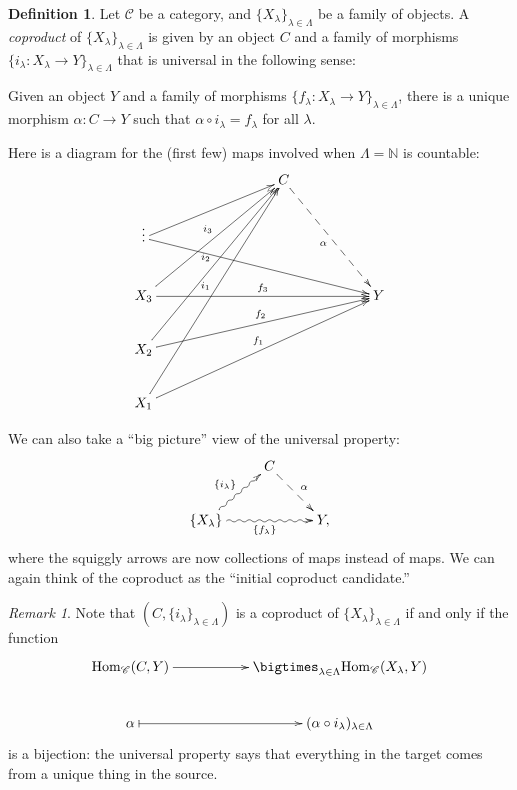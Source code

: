 \documentclass{amsart}[12pt]
\newcommand{\Hom}{\mathrm{Hom}}
\def\sC{\mathscr C}
\newcommand{\N}{\mathbb{N}}
\newcommand{\DEF}[1]{\emph{#1}\index{#1}}
\numberwithin{equation}{section}
\theoremstyle{plain} %
\theoremstyle{definition}
\newtheorem{defn}[equation]{Definition}
\theoremstyle{remark}
\newtheorem{rem}[equation]{Remark}
\begin{document}
\begin{defn} Let $\sC$ be a category, and $\{ X_\lambda\}_{\lambda\in \Lambda}$ be a family of objects. A \DEF{coproduct} of $\{ X_\lambda\}_{\lambda\in \Lambda}$ is given by an object $C$ and a family of morphisms $\{i_\lambda : X_\lambda \to Y\}_{\lambda\in \Lambda}$ that is universal in the following sense:

Given an object $Y$ and a family of morphisms $\{f_\lambda:X_\lambda \to Y\}_{\lambda\in \Lambda}$, there is a unique morphism $\alpha: C\to Y$ such that $\alpha \circ i_\lambda = f_\lambda$ for all $\lambda$.
\end{defn}


Here is a diagram for the (first few) maps involved when $\Lambda=\N$ is countable:
\[\xymatrix{  & & & C \ar@{-->}[ddrr]_{\alpha}& & \\
\vdots\ar[urrr] \ar[drrrrr]  & & & & & \\
X_3\ar[uurrr]^-{i_3} \ar[rrrrr]^-{f_3} & & & & & Y\\
X_2\ar[uuurrr]^-{i_2} \ar[urrrrr]^-{f_2}  & & & & & \\
X_1\ar[uuuurrr]^-{i_1} \ar[uurrrrr]^-{f_1} & & & & &}\]

We can also take a ``big picture'' view of the universal property:
\[\xymatrix{ & C\ar@{-->}[dr]^{\alpha} & \\
\{ X_{\lambda}\} \ar@{~>}[ur]^{\{i_\lambda\}} \ar@{~>}[rr]_{\{f_\lambda\}} & & Y,}\]
where the squiggly arrows are now collections of maps instead of maps. We can again think of the coproduct as the ``initial coproduct candidate.''

\begin{rem}
Note that $(C,\{i_\lambda\}_{\lambda\in\Lambda})$ is a coproduct of $\{ X_\lambda\}_{\lambda\in \Lambda}$ if and only if the function
\[ \xymatrix{ \Hom_{\sC}(C,Y) \ar[rr] & & \bigtimes_{\lambda\in\Lambda} \Hom_{\sC}(X_\lambda,Y)\\
\alpha \ar@{|->}[rr] & &  ( \alpha \circ i_\lambda )_{\lambda\in \Lambda}}\]
is a bijection: the universal property says that everything in the target comes from a unique thing in the source.
\end{rem}
\end{document}
